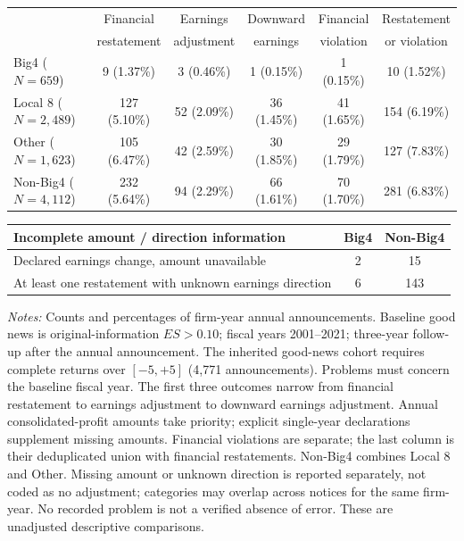 \documentclass[10pt]{article}
\begin{document}
\begin{minipage}{19cm}\fontsize{10}{12}\selectfont\centering
\setlength{\tabcolsep}{4pt}\renewcommand{\arraystretch}{1.15}
\begin{tabular*}{\textwidth}{@{\extracolsep{\fill}}lccccc@{}}\toprule
 & Financial & Earnings & Downward & Financial & Restatement \\
 & restatement & adjustment & earnings & violation & or violation \\
\midrule
Big4 ($N=659$) & 9 (1.37\%) & 3 (0.46\%) & 1 (0.15\%) & 1 (0.15\%) & 10 (1.52\%) \\
Local 8 ($N=2,489$) & 127 (5.10\%) & 52 (2.09\%) & 36 (1.45\%) & 41 (1.65\%) & 154 (6.19\%) \\
Other ($N=1,623$) & 105 (6.47\%) & 42 (2.59\%) & 30 (1.85\%) & 29 (1.79\%) & 127 (7.83\%) \\
Non-Big4 ($N=4,112$) & 232 (5.64\%) & 94 (2.29\%) & 66 (1.61\%) & 70 (1.70\%) & 281 (6.83\%) \\
\bottomrule\end{tabular*}
\par\medskip
\begin{tabular*}{\textwidth}{@{\extracolsep{\fill}}lcc@{}}\toprule
Incomplete amount / direction information & Big4 & Non-Big4 \\ \midrule
Declared earnings change, amount unavailable & 2 & 15 \\
At least one restatement with unknown earnings direction & 6 & 143 \\
\bottomrule\end{tabular*}
\par\medskip\raggedright\fontsize{9}{11}\selectfont
\textit{Notes:} Counts and percentages of firm-year annual announcements. Baseline good news is original-information $ES>0.10$; fiscal years 2001--2021; three-year follow-up after the annual announcement. The inherited good-news cohort requires complete returns over $[-5,+5]$ (4,771 announcements). Problems must concern the baseline fiscal year. The first three outcomes narrow from financial restatement to earnings adjustment to downward earnings adjustment. Annual consolidated-profit amounts take priority; explicit single-year declarations supplement missing amounts. Financial violations are separate; the last column is their deduplicated union with financial restatements. Non-Big4 combines Local 8 and Other. Missing amount or unknown direction is reported separately, not coded as no adjustment; categories may overlap across notices for the same firm-year. No recorded problem is not a verified absence of error. These are unadjusted descriptive comparisons.

\end{minipage}
\end{document}
